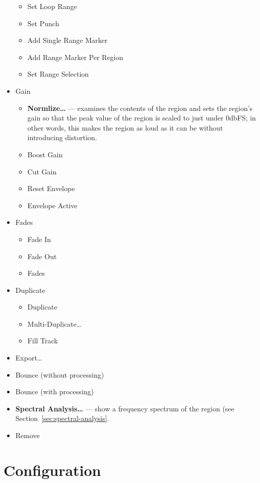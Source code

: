 \documentclass[10pt,a4paper]{book}
\begin{document}
\begin{itemize}
\begin{itemize}
\item Set Loop Range
\item Set Punch
\item Add Single Range Marker
\item Add Range Marker Per Region
\item Set Range Selection
\end{itemize}
\item Gain
\begin{itemize}
\item \textbf{Normlize\ldots} --- examines the contents of the region
  and sets the region's gain so that the peak value of the region is
  scaled to just under 0dbFS; in other words, this makes the region as loud as it
  can be without introducing distortion.
\item Boost Gain
\item Cut Gain
\item Reset Envelope
\item Envelope Active
\end{itemize}
\item Fades
\begin{itemize}
\item Fade In
\item Fade Out
\item Fades
\end{itemize}
\item Duplicate
\begin{itemize}
\item Duplicate
\item Multi-Duplicate\ldots
\item Fill Track
\end{itemize}
\item Export\ldots
\item Bounce (without processing)
\item Bounce (with processing)
\item \textbf{Spectral Analysis\ldots} --- show a frequency spectrum
  of the region (see Section~\ref{sec:spectral-analysis}.
\item Remove
\end{itemize}







\chapter{Configuration}
\end{document}
